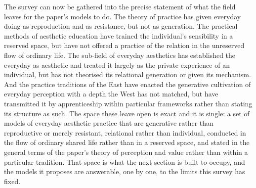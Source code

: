 The survey can now be gathered into the precise statement of what the field leaves for the paper's models to do. The theory of practice has given everyday doing as reproduction and as resistance, but not as generation. The practical methods of aesthetic education have trained the individual's sensibility in a reserved space, but have not offered a practice of the relation in the unreserved flow of ordinary life. The sub-field of everyday aesthetics has established the everyday as aesthetic and treated it largely as the private experience of an individual, but has not theorised its relational generation or given its mechanism. And the practice traditions of the East have enacted the generative cultivation of everyday perception with a depth the West has not matched, but have transmitted it by apprenticeship within particular frameworks rather than stating its structure as such. The space these leave open is exact and it is single: a set of models of everyday aesthetic practice that are generative rather than reproductive or merely resistant, relational rather than individual, conducted in the flow of ordinary shared life rather than in a reserved space, and stated in the general terms of the paper's theory of perception and value rather than within a particular tradition. That space is what the next section is built to occupy, and the models it proposes are answerable, one by one, to the limits this survey has fixed.
